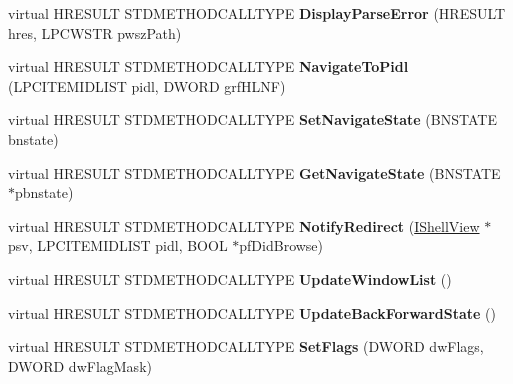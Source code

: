 \begin{DoxyCompactItemize}
\mbox{\label{class_c_common_browser_a60d358be4765c5edde4e57dadc05849d}} 
virtual H\+R\+E\+S\+U\+LT S\+T\+D\+M\+E\+T\+H\+O\+D\+C\+A\+L\+L\+T\+Y\+PE {\bfseries Display\+Parse\+Error} (H\+R\+E\+S\+U\+LT hres, L\+P\+C\+W\+S\+TR pwsz\+Path)
\item 
\mbox{\label{class_c_common_browser_afedcea818535118f3dcad81aaa2d9972}} 
virtual H\+R\+E\+S\+U\+LT S\+T\+D\+M\+E\+T\+H\+O\+D\+C\+A\+L\+L\+T\+Y\+PE {\bfseries Navigate\+To\+Pidl} (L\+P\+C\+I\+T\+E\+M\+I\+D\+L\+I\+ST pidl, D\+W\+O\+RD grf\+H\+L\+NF)
\item 
\mbox{\label{class_c_common_browser_a1621ab032b95140739ad12a35dac4cca}} 
virtual H\+R\+E\+S\+U\+LT S\+T\+D\+M\+E\+T\+H\+O\+D\+C\+A\+L\+L\+T\+Y\+PE {\bfseries Set\+Navigate\+State} (B\+N\+S\+T\+A\+TE bnstate)
\item 
\mbox{\label{class_c_common_browser_a54d177a165c9da8a18177ebc5949f8dd}} 
virtual H\+R\+E\+S\+U\+LT S\+T\+D\+M\+E\+T\+H\+O\+D\+C\+A\+L\+L\+T\+Y\+PE {\bfseries Get\+Navigate\+State} (B\+N\+S\+T\+A\+TE $\ast$pbnstate)
\item 
\mbox{\label{class_c_common_browser_a535934bb7f4f0451cc6038aeb6ab4ea9}} 
virtual H\+R\+E\+S\+U\+LT S\+T\+D\+M\+E\+T\+H\+O\+D\+C\+A\+L\+L\+T\+Y\+PE {\bfseries Notify\+Redirect} (\hyperlink{interface_i_shell_view}{I\+Shell\+View} $\ast$psv, L\+P\+C\+I\+T\+E\+M\+I\+D\+L\+I\+ST pidl, B\+O\+OL $\ast$pf\+Did\+Browse)
\item 
\mbox{\label{class_c_common_browser_aee0768b152c1086d7198726a6f3a4a2a}} 
virtual H\+R\+E\+S\+U\+LT S\+T\+D\+M\+E\+T\+H\+O\+D\+C\+A\+L\+L\+T\+Y\+PE {\bfseries Update\+Window\+List} ()
\item 
\mbox{\label{class_c_common_browser_aae2a699ae11a53461a05b685f5b20cf4}} 
virtual H\+R\+E\+S\+U\+LT S\+T\+D\+M\+E\+T\+H\+O\+D\+C\+A\+L\+L\+T\+Y\+PE {\bfseries Update\+Back\+Forward\+State} ()
\item 
\mbox{\label{class_c_common_browser_a6d952b34ce40c6c999208bbf4349e2e4}} 
virtual H\+R\+E\+S\+U\+LT S\+T\+D\+M\+E\+T\+H\+O\+D\+C\+A\+L\+L\+T\+Y\+PE {\bfseries Set\+Flags} (D\+W\+O\+RD dw\+Flags, D\+W\+O\+RD dw\+Flag\+Mask)

\end{DoxyCompactItemize}
